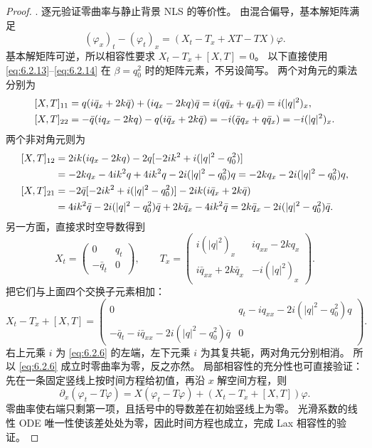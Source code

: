 \documentclass[lang=cn,scheme=chinese,mode=simple,device=normal,color=blue,
math=cm,thmcnt=section,12pt]{elegantbook}
\begin{document}
\begin{proof}
    {. 逐元验证零曲率与静止背景 NLS 的等价性。}
    由混合偏导，基本解矩阵满足
    \[
        (\varphi_x)_t-(\varphi_t)_x=(X_t-T_x+XT-TX)\varphi.
    \]
    基本解矩阵可逆，所以相容性要求 $X_t-T_x+[X,T]=0$。
    以下直接使用 \eqref{eq:6.2.13}--\eqref{eq:6.2.14} 在 $\beta=q_0^2$ 时的矩阵元素，不另设简写。
    两个对角元的乘法分别为
    \[
        \begin{aligned}
            \relax[X,T]_{11}
             & =q(i\bar q_x+2k\bar q)+(iq_x-2kq)\bar q
            =i(q\bar q_x+q_x\bar q)=i(|q|^2)_x,         \\
            [X,T]_{22}
             & =-\bar q(iq_x-2kq)-q(i\bar q_x+2k\bar q)
            =-i(\bar q q_x+q\bar q_x)=-i(|q|^2)_x.
        \end{aligned}
    \]
    两个非对角元则为
    \[
        \begin{aligned}
            \relax[X,T]_{12}
             & =2ik(iq_x-2kq)-2q[-2ik^2+i(|q|^2-q_0^2)]                  \\
             & =-2kq_x-4ik^2q+4ik^2q-2i(|q|^2-q_0^2)q
            =-2kq_x-2i(|q|^2-q_0^2)q,                                    \\
            [X,T]_{21}
             & =-2\bar q[-2ik^2+i(|q|^2-q_0^2)]-2ik(i\bar q_x+2k\bar q)  \\
             & =4ik^2\bar q-2i(|q|^2-q_0^2)\bar q+2k\bar q_x-4ik^2\bar q
            =2k\bar q_x-2i(|q|^2-q_0^2)\bar q.
        \end{aligned}
    \]
    另一方面，直接求时空导数得到
    \[
        X_t=\begin{pmatrix}0&q_t\\-\bar q_t&0\end{pmatrix},\qquad
        T_x=\begin{pmatrix}i(|q|^2)_x&iq_{xx}-2kq_x\\i\bar q_{xx}+2k\bar q_x&-i(|q|^2)_x\end{pmatrix}.
    \]
    把它们与上面四个交换子元素相加：
    \[
        X_t-T_x+[X,T]
        =\begin{pmatrix}
            0                                            & q_t-iq_{xx}-2i(|q|^2-q_0^2)q \\
            -\bar q_t-i\bar q_{xx}-2i(|q|^2-q_0^2)\bar q & 0
        \end{pmatrix}.
    \]
    右上元乘 $i$ 为 \eqref{eq:6.2.6} 的左端，左下元乘 $i$ 为其复共轭，两对角元分别相消。
    所以 \eqref{eq:6.2.6} 成立时零曲率为零，反之亦然。
    局部相容性的充分性也可直接验证：先在一条固定竖线上按时间方程给初值，再沿 $x$ 解空间方程，则
    \[
        \partial_x(\varphi_t-T\varphi)
        =X(\varphi_t-T\varphi)+(X_t-T_x+[X,T])\varphi.
    \]
    零曲率使右端只剩第一项，且括号中的导数差在初始竖线上为零。
    光滑系数的线性 ODE 唯一性使该差处处为零，因此时间方程也成立，完成 Lax 相容性的验证。
\end{proof}
\end{document}
